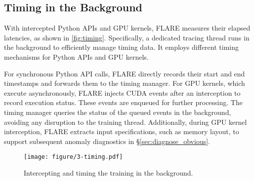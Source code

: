 \subsection{Timing in the Background}

With intercepted Python APIs and GPU kernels, FLARE measures their elapsed latencies, as shown in \autoref{fig:timing}. Specifically, a dedicated tracing thread runs in the background to efficiently manage timing data. It employs different timing mechanisms for Python APIs and GPU kernels.

For synchronous Python API calls, FLARE directly records their start and end timestamps and forwards them to the timing manager. For GPU kernels, which execute asynchronously, FLARE injects CUDA events\cite{cudaevents2024} after an interception to record execution status. These events are enqueued for further processing. The timing manager queries the status of the queued events in the background, avoiding any disruption to the training thread. Additionally, during GPU kernel interception, FLARE extracts input specifications, such as memory layout, to support subsequent anomaly diagnostics in \S\ref{sec:diagnose_obvious}.

\begin{figure}
    \centering
    \texttt{[image: figure/3-timing.pdf]}
    \caption{Intercepting and timing the training in the background.}
    \label{fig:timing}
    \vspace{-4mm}
\end{figure}


